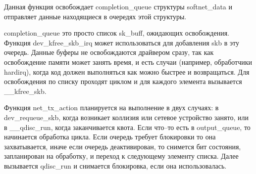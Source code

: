 Данная функция освобождает completion\_queue структуры softnet\_data и отправляет данные находящиеся в очередях этой структуры. 

completion\_queue это просто список sk\_buff, ожидающих освобождения. Функция dev\_kfree\_skb\_irq может использоваться для добавления skb в эту очередь. Данные буферы не освобождаются драйвером сразу, так как освобождение памяти может занять время, и есть случаи (например, обработчики hardirq), когда код должен выполняться как можно быстрее и возвращаться. Для освобождения по списку проходят циклом и для каждого элемента вызывается \_\_kfree\_skb.

Функция net\_tx\_action планируется на выполнение в двух случаях: в dev\_requeue\_skb, когда возникает коллизия или сетевое устройство занято, или в \_\_qdisc\_run, когда заканчивается квота. Если что--то есть в output\_queue, то начинается обработка цикла. Если очередь требует блокировки то она захватывается, иначе если очередь деактивирован, то снимется бит состояния, запланирован на обработку, и переход к следующему элементу списка. Далее вызывается  qdisc\_run и снимается блокировка, если она использовалась.